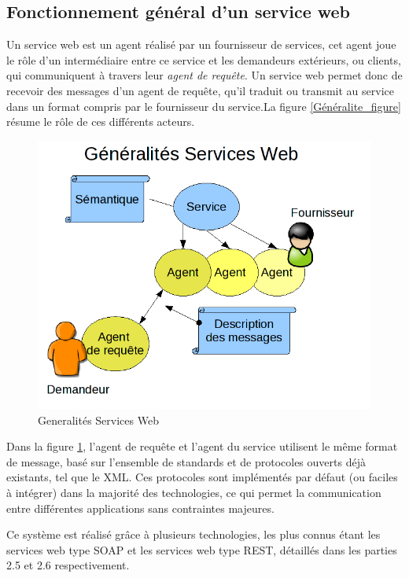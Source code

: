 \subsection{Fonctionnement général d'un service web}
Un service web est un agent réalisé par un fournisseur de services, cet agent joue le rôle d'un intermédiaire entre ce service et les demandeurs extérieurs, ou clients, qui communiquent à travers leur \emph{agent de requête}. 
\newline			
Un service web permet donc de recevoir des messages d'un agent de requête, qu'il traduit ou transmit au service dans un format compris par le fournisseur du service.\newline La figure \ref{Généralite_figure} résume le rôle de ces différents acteurs.
\begin{figure}[h]
	\center
	\includegraphics[scale=0.5]{img/Whatisaserviceweb.png}
	\caption{Generalités Services Web}		
	\label{Generalite_figure}
	\centering
\end{figure}						
\newline
Dans la figure \ref{Generalite_figure}, l'agent de requête et l'agent du service utilisent le même format de message, basé sur l'ensemble de standards et de protocoles ouverts déjà existants, tel que le XML.
Ces protocoles sont implémentés par défaut (ou faciles à intégrer) dans la majorité des technologies, ce qui permet la communication entre différentes applications sans contraintes majeures. 
	
Ce système est réalisé grâce à plusieurs technologies, les plus connus étant les services web type SOAP et les services web type REST, détaillés dans les parties 2.5 et 2.6 respectivement.
	
